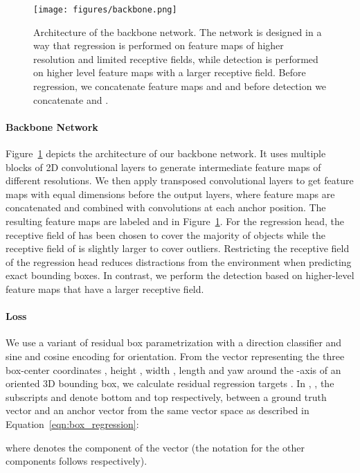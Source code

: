 \documentclass{article}
\begin{document}
\begin{figure}[ht]
  \centering
  \texttt{[image: figures/backbone.png]}
  \caption{Architecture of the backbone network. The network is designed in a way that regression is performed on feature maps of higher resolution and limited receptive fields, while detection is performed on higher level feature maps with a larger receptive field. Before regression, we concatenate feature maps  and  and before detection we concatenate  and .}
  \label{fig:backbone}
\end{figure}

\paragraph{Backbone Network}
Figure~\ref{fig:backbone} depicts the architecture of our backbone network.
It uses multiple blocks of 2D convolutional layers to generate intermediate feature maps of different resolutions. We then apply transposed convolutional layers to get feature maps with equal dimensions before the output layers, where feature maps are concatenated and combined with  convolutions at each anchor position.
The resulting feature maps are labeled  and  in Figure~\ref{fig:backbone}. 
For the regression head, the receptive field of  has been chosen to cover the majority of objects while the receptive field of  is slightly larger to cover outliers.
Restricting the receptive field of the regression head reduces distractions from the environment when predicting exact bounding boxes.
In contrast, we perform the detection based on higher-level feature maps that have a larger receptive field.

\paragraph{Loss}
We use a variant of residual box parametrization with a direction classifier \cite{Yan2018second} and sine and cosine encoding for orientation. 
From the vector  representing the three box-center coordinates , height , width , length  and yaw  around the -axis of an oriented 3D bounding box, we calculate 
residual regression targets . In , , the subscripts  and  denote bottom and top respectively, between a ground truth vector  and an anchor vector  from the same vector space as described in Equation~\eqref{eqn:box_regression}:


 where   denotes the component  of the vector  (the notation 
 for the other components follows respectively).
\end{document}
